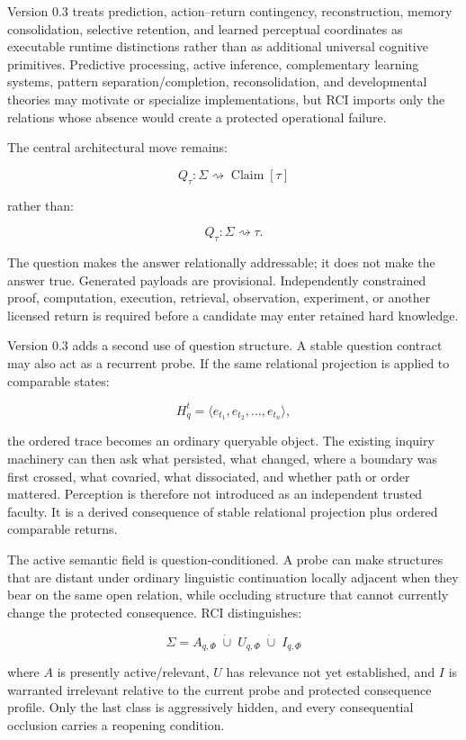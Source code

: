 \documentclass[
]{article}
\begin{document}
Version 0.3 treats prediction, action--return contingency, reconstruction,
memory consolidation, selective retention, and learned perceptual coordinates
as executable runtime distinctions rather than as additional universal
cognitive primitives. Predictive processing, active inference, complementary
learning systems, pattern separation/completion, reconsolidation, and
developmental theories may motivate or specialize implementations, but RCI
imports only the relations whose absence would create a protected operational
failure.

The central architectural move remains:

\[
\boxed{
Q_\tau
:
\Sigma
\rightsquigarrow
\operatorname{Claim}[\tau]
}
\]

rather than:

\[
Q_\tau:\Sigma\rightsquigarrow\tau.
\]

The question makes the answer relationally addressable; it does not make the
answer true. Generated payloads are provisional. Independently constrained
proof, computation, execution, retrieval, observation, experiment, or another
licensed return is required before a candidate may enter retained hard
knowledge.

Version 0.3 adds a second use of question structure. A stable question contract
may also act as a recurrent probe. If the same relational projection is applied
to comparable states:

\[
H_q^t
=
\langle e_{t_1},e_{t_2},\ldots,e_{t_n}\rangle,
\]

the ordered trace becomes an ordinary queryable object. The existing inquiry
machinery can then ask what persisted, what changed, where a boundary was first
crossed, what covaried, what dissociated, and whether path or order mattered.
Perception is therefore not introduced as an independent trusted faculty. It is
a derived consequence of stable relational projection plus ordered comparable
returns.

The active semantic field is question-conditioned. A probe can make structures
that are distant under ordinary linguistic continuation locally adjacent when
they bear on the same open relation, while occluding structure that cannot
currently change the protected consequence. RCI distinguishes:

\[
\boxed{
\Sigma
=
A_{q,\Phi}
\;\dot\cup\;
U_{q,\Phi}
\;\dot\cup\;
I_{q,\Phi}
}
\]

where \(A\) is presently active/relevant, \(U\) has relevance not yet
established, and \(I\) is warranted irrelevant relative to the current probe
and protected consequence profile. Only the last class is aggressively hidden,
and every consequential occlusion carries a reopening condition.
\end{document}
